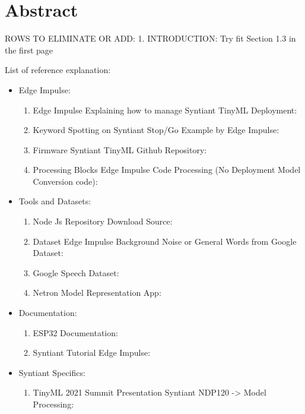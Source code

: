 \chapter*{Abstract} %
\label{abtract}

ROWS TO ELIMINATE OR ADD:
1. INTRODUCTION: Try fit Section 1.3 in the first page\newline\newline

List of reference explanation:\newline
\begin{itemize} 
\item Edge Impulse:
\begin{enumerate}
    \item Edge Impulse Explaining how to manage Syntiant TinyML Deployment: \cite{edgeimpulse_syntiant_tinyml}
    \item Keyword Spotting on Syntiant Stop/Go Example by Edge Impulse: \cite{edgeimpulse_kws_example}
    \item Firmware Syntiant TinyML Github Repository: \cite{edgeimpulse_firmware_syntiant}
    \item Processing Blocks Edge Impulse Code Processing (No Deployment Model Conversion code): \cite{edgeimpulse_processing_blocks}
\end{enumerate}
\item Tools and Datasets:
\begin{enumerate}
    \item Node Js Repository Download Source: \cite{nodejs_repository}
    \item Dataset Edge Impulse Background Noise or General Words from Google Dataset: \cite{edgeimpulse_dataset_499022}
    \item Google Speech Dataset: \cite{speechcommands}
    \item Netron Model Representation App: \cite{netron}
\end{enumerate}
\item Documentation:
\begin{enumerate}
    \item ESP32 Documentation: \cite{esp32documentation}
    \item Syntiant Tutorial Edge Impulse: \cite{syntiant_tutorial_edgeimpulse}
\end{enumerate}
\item Syntiant Specifics:
\begin{enumerate}
    \item TinyML 2021 Summit Presentation Syntiant NDP120 -> Model Processing: \cite{tinyML_2021_summit}

\end{enumerate}
\end{itemize}
